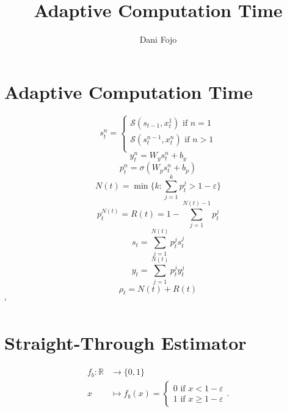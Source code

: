 \documentclass[12pt]{article}
\title{Adaptive Computation Time}
\author{Dani Fojo}
\def\RR{\mathbb R}   %
\def\vepsilon{\varepsilon}   %
\begin{document}
\maketitle


\section{Adaptive Computation Time}

\begin{equation}
s_t^n = 
	\begin{cases}
	\mathcal{S}(s_{t-1}, x_t^1) \text{ if } n = 1\\
	\mathcal{S}(s_t^{n-1}, x_t^n) \text{ if } n > 1\\
	\end{cases}
\end{equation}
\begin{equation}
y_t^n = W_y s_t^n + b_y
\end{equation}
\begin{equation}
p_t^n = \sigma(W_p s_t^n + b_p)
\end{equation}
\begin{equation}
N(t) = \min\{k:\sum_{j=1}^k p_t^j>1-\vepsilon\}
\end{equation}
\begin{equation}
p_t^{N(t)} = R(t) = 1 - \sum_{j=1}^{N(t)-1}p_t^j
\end{equation}
\begin{equation}
s_t = \sum_{j=1}^{N(t)}p_t^j s_t^j
\end{equation}
\begin{equation}
y_t = \sum_{j=1}^{N(t)}p_t^j y_t^j
\end{equation}
\begin{equation}
\rho_t = N(t) + R(t)
\end{equation}`
\newpage
\section{Straight-Through Estimator}

\begin{align}
f_b \colon \RR &\to \{0, 1\}\\
x &\mapsto f_b(x) = \begin{cases}
0 \text{ if } x<1-\vepsilon\\
1 \text{ if } x \ge 1-\vepsilon
\end{cases}.
\end{align}
\end{document}
